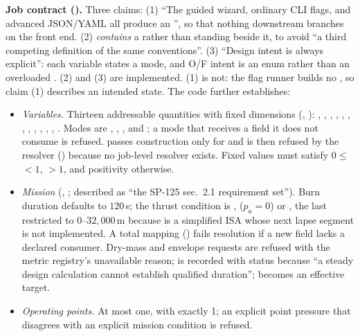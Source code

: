 \textbf{Job contract ().} Three claims: (1) ``The guided wizard, ordinary CLI flags, and advanced JSON/YAML all produce an '', so that nothing downstream branches on the front end. (2)  \emph{contains} a  rather than standing beside it, to avoid ``a third competing definition of the same conventions''. (3) ``Design intent is always explicit'': each variable states a mode, and O/F intent is an enum rather than an overloaded . (2) and (3) are implemented. (1) is not: the flag runner builds no , so claim (1) describes an intended state. The code further establishes:
\begin{itemize}
  \item \emph{Variables.} Thirteen addressable quantities with fixed dimensions (, ): , , , , , , , , , , , , . Modes are , , ,  and ; a mode that receives a field it does not consume is refused.  passes construction only for  and is then refused by the resolver () because no job-level resolver exists. Fixed values must satisfy $0 \leq$  $< 1$,  $> 1$, and positivity otherwise.
  \item \emph{Mission} (, ; described as ``the SP-125 sec.~2.1 requirement set''). Burn duration defaults to $120\,$s; the thrust condition is ,  ($p_a = 0$) or , the last restricted to $0$--$32{,}000\,$m because  is a simplified ISA whose next lapse segment is not implemented. A total  mapping () fails resolution if a new  field lacks a declared consumer. Dry-mass and envelope requests are refused with the metric registry's unavailable reason;  is recorded with status  because ``a steady design calculation cannot establish qualified duration'';  becomes an effective  target.
  \item \emph{Operating points.} At most one, with  exactly 1; an explicit point pressure that disagrees with an explicit mission condition is refused.

\end{itemize}

